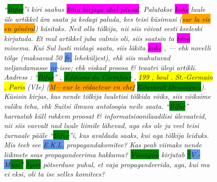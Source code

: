 \documentclass[runningheads]{llncs}
\begin{document}
\begin{figure}
  \centering
  \begin{minipage}{0.9\textwidth}
\itshape
  ``\colorbox{Green}{Bifur}''i kiri saabus \colorbox{Magenta}{Sinu kirjaga \"uhel p\"aeval}. Palutakse \colorbox{Magenta}{kohe} luule \"ule artikkel \"ara saata ja kedagi paluda, kes teisi k\"usimusi
  (\colorbox{Orange}{sur la vie en g\'en\'eral})
k\"asitaks. Neil olla t\~olkija, nii siis v\~oivat eesti keeleski kirjutada. Et mul artikkel juba valmis oli, siis saatsin ta \colorbox{Magenta}{t\"ana} minema. Kui Sul lusti midagi saata, siis l\"akita \colorbox{Magenta}{kohe} , --- ehk novelli t\~olge (maksavad 50 \colorbox{CornflowerBlue}{fr.} lehek\"uljest), ehk siis mahutavad neljandamasse \colorbox{CornflowerBlue}{nr}-isse; ehk viskad proosa \& teaatri \"ulegi artikli. Aadress : ``\colorbox{Green}{Bifur}'' , \colorbox{Green}{\'Editions du Carrefour} , \colorbox{Yellow}{199 , boul . St.-Germain , Paris} (VIe) (\colorbox{Orange}{M–--eur le r\'edacteur en chef}  \colorbox{Green}{Ribemont Dessaignes}). K\"usisin kirjas, kas nende t\~olkija luuletisi t\~olkida v\~oiks, siis v\~oiksime valiku teha, ehk Suitsi ilmuva antoloogia neile saata. ``\colorbox{Green}{Bifur}'' harrastab k\"ull rohkem proosat \& informatsioonilaadilisi \"ulevaateid, nii siis vaevalt nad luule liimile l\"ahevad, aga eks ole ju veel teisi \v{z}urnaale p\"a\"ale ``\colorbox{Green}{Bifur}''i, kus avaldada saaks, kui aga t\~olkija leiduks. Mis teeb see \colorbox{CornflowerBlue}{E.K.L.} propagandakomitee? Kas peab viimaks nende liikmete seas propagandeerima hakkama? \colorbox{Green}{Visnapuu} kirjutab \colorbox{Green}{``\colorbox{CornflowerBlue}{V.-M}aas''} \colorbox{Green}{Igori} p\"otserduse puhul, et vaja propagandeerida, aga, kui ma ei eksi, oli ta ise selles komitees?

  \end{minipage}
  
  \begin{minipage}{0.9\textwidth}
    \vspace{18pt}

\end{minipage}
\end{figure}
\end{document}
